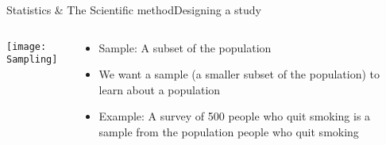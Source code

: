 \documentclass[xcolor=dvipsnames]{beamer}
\begin{document}
\begin{frame}{Statistics \& The Scientific method}{Designing a study}
	\begin{columns}
		\begin{column}{0.5 \textwidth}
			\texttt{[image: Sampling]}
		\end{column}
		\begin{column}{0.5 \textwidth}
			\begin{itemize}
				\item Sample: A subset of the population
				\item We want a sample (a smaller subset of the population) to learn about a population
				\item Example: A survey of 500 people who quit smoking is a sample from the population people who quit smoking
			\end{itemize}
		\end{column}
	\end{columns}
\end{frame}
\end{document}
